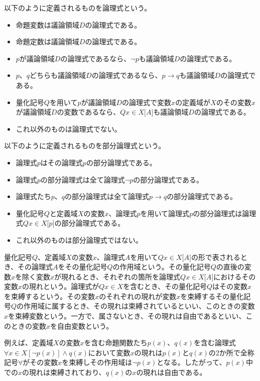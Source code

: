 \documentclass[a4paper]{jsarticle}
\begin{document}
\begin{axs}
以下のように定義されるものを論理式という。
\begin{itemize}
\item
  命題変数は議論領域$D$の論理式である。
\item
  命題定数は議論領域$D$の論理式である。
\item
  $p$が議論領域$D$の論理式であるなら、$\neg p$も議論領域$D$の論理式である。
\item
  $p$、$q$どちらも議論領域$D$の論理式であるなら、$p \rightarrow q$も議論領域$D$の論理式である。
\item
  量化記号$Q$を用いて$p$が議論領域$D$の論理式で変数$x$の定義域が$X$のその変数$x$が議論領域$D$の変数であるなら、$Qx \in X\lbrack A\rbrack$も議論領域$D$の論理式である。
\item
  これ以外のものは論理式でない。
\end{itemize}
\end{axs}
\begin{axs}
以下のように定義されるものを部分論理式という。
\begin{itemize}
\item
  論理式$p$はその論理式$p$の部分論理式である。
\item
  論理式$p$の部分論理式は全て論理式$\neg p$の部分論理式である。
\item
  論理式たち$p$、$q$の部分論理式は全て論理式$p \rightarrow q$の部分論理式である。
\item
  量化記号$Q$と定義域$X$の変数$x$、論理式$p$を用いて論理式$p$の部分論理式は論理式$Qx \in X\lbrack p\rbrack$の部分論理式である。
\item
  これ以外のものは部分論理式ではない。
\end{itemize}
\end{axs}
\begin{dfn}
量化記号$Q$、定義域$X$の変数$x$、論理式$A$を用いて$Qx \in X\lbrack A\rbrack$の形で表されるとき、その論理式$A$をその量化記号$Q$の作用域という。その量化記号$Q$の直後の変数$x$を除く変数$x$が現れるとき、それぞれの箇所を論理式$Qx \in X\lbrack A\rbrack$におけるその変数$x$の現れという。論理式が$Qx \in X$を含むとき、その量化記号$Q$はその変数$x$を束縛するという。その変数$x$のそれぞれの現れが変数$x$を束縛するその量化記号$Q$の作用域に属するとき、その現れは束縛されているといい、このときの変数$x$を束縛変数という。一方で、属さないとき、その現れは自由であるといい、このときの変数$x$を自由変数という。
\end{dfn}
例えば、定義域$X$の変数$x$を含む命題関数たち$p(x)$、$q(x)$を含む論理式$\forall x \in X\left[ \neg p(x) \right] \land q(x)$において変数$x$の現れは$p(x)$と$q(x)$の2か所で全称記号$\forall$がその変数$x$を束縛しその作用域は$\neg p(x)$となる。したがって、$p(x)$中での$x$の現れは束縛されており、$q(x)$の$x$の現れは自由である。
\end{document}
